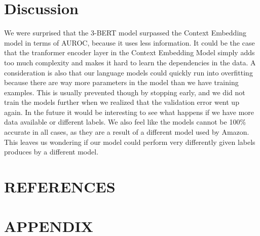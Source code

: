 \documentclass{article}
\begin{document}
\section{Discussion}

We were surprised that the 3-BERT model surpassed the Context Embedding model in terms of AUROC, because it uses less information. It could be the case that the tranformer encoder layer in the Context Embedding Model simply adds too much complexity and makes it hard to learn the dependencies in the data. A consideration is also that our language models could quickly run into overfitting because there are way more parameters in the model than we have training examples. This is usually prevented though by stopping early, and we did not train the models further when we realized that the validation error went up again.
In the future it would be interesting to see what happens if we have more data available or different labels. We also feel like the models cannot be 100\% accurate in all cases, as they are a result of a different model used by Amazon. This leaves us wondering if our model could perform very differently given labels produces by a different model.

\vfill\pagebreak

\section{REFERENCES}
\label{sec:refs}

% 
% 

\renewcommand\refname{Bibliography}




\pagebreak
\section{APPENDIX}
\end{document}
